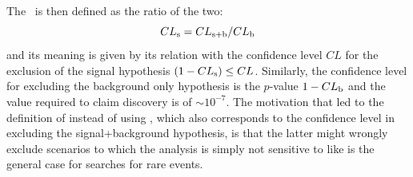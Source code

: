 The \ is then defined as the ratio of the two:
\begin{equation}\label{eq:cls}
\cls{s} = \cls{s+b}/\cls{b}
\end{equation}
and its meaning is given by its relation with the confidence 
level $CL$ for the exclusion of the signal hypothesis 
$(1 - \cls{s}) \leq CL$.
Similarly, the confidence level for excluding the background only
hypothesis is the $p$-value $1 - \cls{b}$ and the value required to claim 
discovery is of $\sim 10^{-7}$. The motivation that led to
the definition of  instead of using , which also
corresponds to the confidence level in excluding the signal+background
hypothesis, is that the latter might wrongly exclude scenarios to
which the analysis is simply not sensitive to like is the general case
for searches for rare events.

